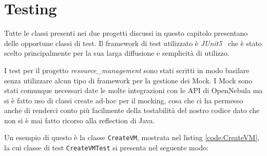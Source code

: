 \section{Testing}
Tutte le classi presenti nei due progetti discussi in questo capitolo presentano delle opportune classi di test. Il framework di test utilizzato è \emph{JUnit5}~\cite{junit5} che è stato scelto principalmente per la sua larga diffusione e semplicità di utilizzo.\par
I test per il progetto \emph{resource\_management} sono stati scritti in modo basilare senza utilizzare alcun tipo di framework per la gestione dei Mock. I Mock sono stati comunque necessari date le molte integrazioni con le API di OpenNebula ma si è fatto uso di classi create ad-hoc per il mocking, cosa che ci ha permesso anche di renderci conto più facilmente della testabilità del nostro codice dato che non si è mai fatto ricorso alla reflection di Java.\par
Un esempio di questo è la classe \texttt{CreateVM}, mostrata nel listing \ref{code:CreateVM}, la cui classe di test \texttt{CreateVMTest} si presenta nel seguente modo:
